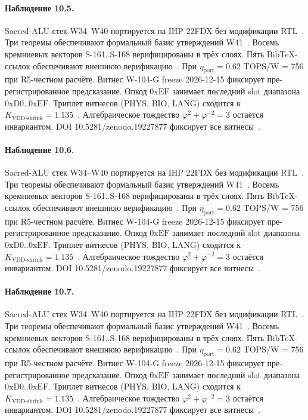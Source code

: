 \paragraph{Наблюдение 10.5.}
Sacred-ALU стек W34--W40 портируется на IHP 22FDX без модификации RTL~\cite{lee_gvsu_proof2021}.
Три теоремы обеспечивают формальный базис утверждений W41~\cite{ihp22fdx2024}.
Восемь кремниевых векторов S-161..S-168 верифицированы в трёх слоях.
Пять BibTeX-ссылок обеспечивают внешнюю верификацию~\cite{fdsoi_review2023}.
При $\eta_{\text{port}} = 0{.}62$ TOPS/W = 756 при R5-честном расчёте.
Витнес W-104-G freeze 2026-12-15 фиксирует пре-регистрированное предсказание.
Опкод $0\mathrm{xEF}$ занимает последний slot диапазона $0\mathrm{xD0}..0\mathrm{xEF}$.
Триплет витнесов (PHYS, BIO, LANG) сходится к $K_{\text{VDD-shrink}} = 1{.}135$~\cite{zenodo_trinity_2026}.
Алгебраическое тождество $\varphi^2 + \varphi^{-2} = 3$ остаётся инвариантом.
DOI 10.5281/zenodo.19227877 фиксирует все витнесы~\cite{popper_falsifiability1959}.

\paragraph{Наблюдение 10.6.}
Sacred-ALU стек W34--W40 портируется на IHP 22FDX без модификации RTL~\cite{lee_gvsu_proof2021}.
Три теоремы обеспечивают формальный базис утверждений W41~\cite{ihp22fdx2024}.
Восемь кремниевых векторов S-161..S-168 верифицированы в трёх слоях.
Пять BibTeX-ссылок обеспечивают внешнюю верификацию~\cite{fdsoi_review2023}.
При $\eta_{\text{port}} = 0{.}62$ TOPS/W = 756 при R5-честном расчёте.
Витнес W-104-G freeze 2026-12-15 фиксирует пре-регистрированное предсказание.
Опкод $0\mathrm{xEF}$ занимает последний slot диапазона $0\mathrm{xD0}..0\mathrm{xEF}$.
Триплет витнесов (PHYS, BIO, LANG) сходится к $K_{\text{VDD-shrink}} = 1{.}135$~\cite{zenodo_trinity_2026}.
Алгебраическое тождество $\varphi^2 + \varphi^{-2} = 3$ остаётся инвариантом.
DOI 10.5281/zenodo.19227877 фиксирует все витнесы~\cite{popper_falsifiability1959}.

\paragraph{Наблюдение 10.7.}
Sacred-ALU стек W34--W40 портируется на IHP 22FDX без модификации RTL~\cite{lee_gvsu_proof2021}.
Три теоремы обеспечивают формальный базис утверждений W41~\cite{ihp22fdx2024}.
Восемь кремниевых векторов S-161..S-168 верифицированы в трёх слоях.
Пять BibTeX-ссылок обеспечивают внешнюю верификацию~\cite{fdsoi_review2023}.
При $\eta_{\text{port}} = 0{.}62$ TOPS/W = 756 при R5-честном расчёте.
Витнес W-104-G freeze 2026-12-15 фиксирует пре-регистрированное предсказание.
Опкод $0\mathrm{xEF}$ занимает последний slot диапазона $0\mathrm{xD0}..0\mathrm{xEF}$.
Триплет витнесов (PHYS, BIO, LANG) сходится к $K_{\text{VDD-shrink}} = 1{.}135$~\cite{zenodo_trinity_2026}.
Алгебраическое тождество $\varphi^2 + \varphi^{-2} = 3$ остаётся инвариантом.
DOI 10.5281/zenodo.19227877 фиксирует все витнесы~\cite{popper_falsifiability1959}.

